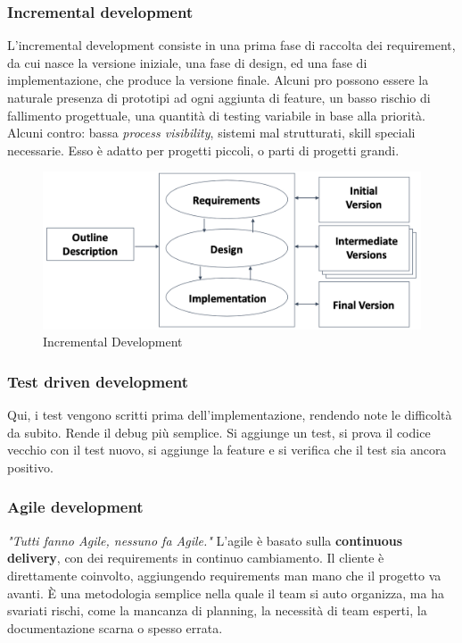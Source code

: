 \documentclass[11pt]{article}
\begin{document}
\subsubsection{Incremental development}
L'incremental development consiste in una prima fase di raccolta dei requirement, da cui nasce la versione iniziale, una fase di design, ed una fase di implementazione, che produce la versione finale. Alcuni pro possono essere la naturale presenza di prototipi ad ogni aggiunta di feature, un basso rischio di fallimento progettuale, una quantità di testing variabile in base alla priorità. Alcuni contro: bassa \textit{process visibility}, sistemi mal strutturati, skill speciali necessarie. Esso è adatto per progetti piccoli, o parti di progetti grandi. 
\begin{figure}[H]
    \centering
    \includegraphics[width=\linewidth]{res/teoria/IncrementalDevelopment.png}
    \caption{Incremental Development}
\end{figure}
\subsubsection{Test driven development}
Qui, i test vengono scritti prima dell'implementazione, rendendo note le difficoltà da subito. Rende il debug più semplice. Si aggiunge un test, si prova il codice vecchio con il test nuovo, si aggiunge la feature e si verifica che il test sia ancora positivo. 
\subsubsection{Agile development}
\textit{"Tutti fanno Agile, nessuno fa Agile."} L'agile è basato sulla \textbf{continuous delivery}, con dei requirements in continuo cambiamento. Il cliente è direttamente coinvolto, aggiungendo requirements man mano che il progetto va avanti. È una metodologia semplice nella quale il team si auto organizza, ma ha svariati rischi, come la mancanza di planning, la necessità di team esperti, la documentazione scarna o spesso errata. 
\end{document}
